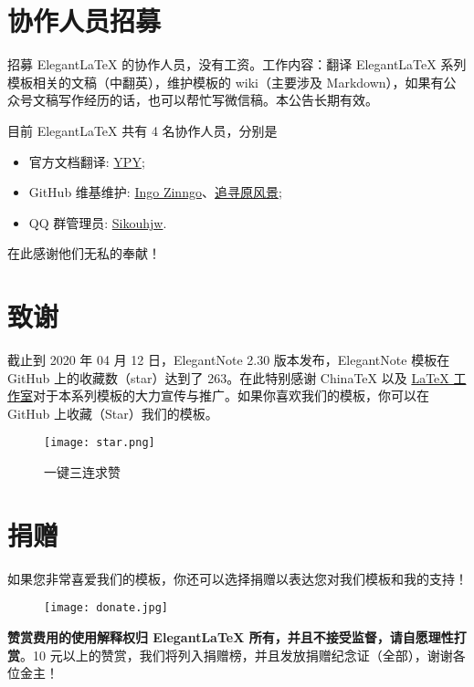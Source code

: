 \documentclass[cn,hazy,blue,14pt,screen]{elegantnote}
\begin{document}
\section{协作人员招募}

招募 Elegant\LaTeX{} 的协作人员，没有工资。工作内容：翻译 Elegant\LaTeX{} 系列模板相关的文稿（中翻英），维护模板的 wiki（主要涉及 Markdown），如果有公众号文稿写作经历的话，也可以帮忙写微信稿。本公告长期有效。

目前 ElegantLaTeX 共有 4 名协作人员，分别是
\begin{itemize}
  \item 官方文档翻译: \href{https://github.com/peggy2006xzyz}{YPY};
  \item GitHub 维基维护: \href{https://github.com/izinngo}{Ingo Zinngo}、\href{https://github.com/xiaohao890809}{追寻原风景};
  \item QQ 群管理员: \href{https://github.com/sikouhjw}{Sikouhjw}.
\end{itemize}

在此感谢他们无私的奉献！


\section{致谢}

截止到 2020 年 04 月 12 日，ElegantNote 2.30 版本发布，ElegantNote 模板在 GitHub 上的收藏数（star）达到了 263。在此特别感谢 China\TeX{} 以及 \href{http://www.latexstudio.net/}{\LaTeX{} 工作室}对于本系列模板的大力宣传与推广。如果你喜欢我们的模板，你可以在 GitHub 上收藏（Star）我们的模板。

\begin{figure}[htbp]
  \centering
  \texttt{[image: star.png]}
  \caption{一键三连求赞}
\end{figure}


\section{捐赠}

如果您非常喜爱我们的模板，你还可以选择捐赠以表达您对我们模板和我的支持！

\begin{figure}[htbp]
  \centering
  \texttt{[image: donate.jpg]}
\end{figure}

\textbf{赞赏费用的使用解释权归 Elegant\LaTeX{} 所有，并且不接受监督，请自愿理性打赏}。10 元以上的赞赏，我们将列入捐赠榜，并且发放捐赠纪念证（全部），谢谢各位金主！
\end{document}
